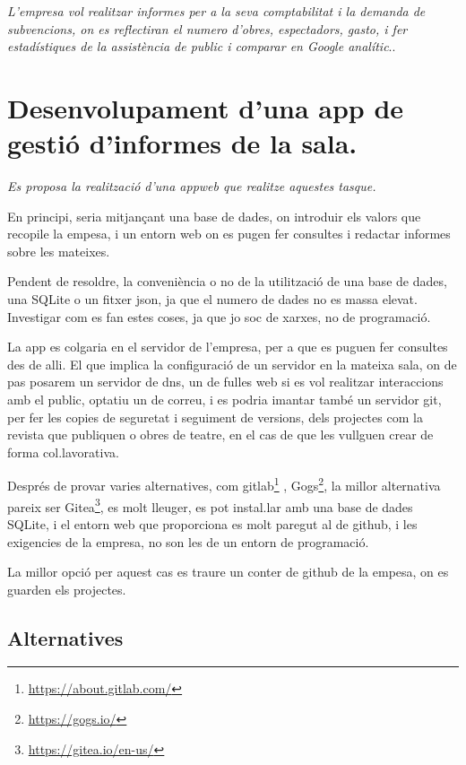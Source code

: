 \documentclass[
  10pt, krantz2,
]{krantz}
\DeclareRobustCommand{\href}[2]{#2\footnote{\url{#1}}}
\renewenvironment{quote}{\begin{VF}}{\end{VF}}
\renewcommand{\href}[2]{#2\footnote{\url{#1}}}
\begin{document}
\emph{L'empresa vol realitzar informes per a la seva comptabilitat i la demanda de subvencions, on es reflectiran el numero d'obres, espectadors, gasto, i fer estadístiques de la assistència de public i comparar en Google analític}..

\hypertarget{desenvolupament-duna-app-de-gestiuxf3-dinformes-de-la-sala.}{%
\section{Desenvolupament d'una app de gestió d'informes de la sala.}\label{desenvolupament-duna-app-de-gestiuxf3-dinformes-de-la-sala.}}

\emph{Es proposa la realització d'una appweb que realitze aquestes tasque.}

En principi, seria mitjançant una base de dades, on introduir els valors que recopile la empesa, i un entorn web on es pugen fer consultes i redactar informes sobre les mateixes.

\begin{quote}
Pendent de resoldre, la conveniència o no de la utilització de una base de dades, una SQLite o un fitxer json, ja que el numero de dades no es massa elevat.\\
Investigar com es fan estes coses, ja que jo soc de xarxes, no de programació.
\end{quote}

La app es colgaria en el servidor de l'empresa, per a que es puguen fer consultes des de alli. El que implica la configuració de un servidor en la mateixa sala, on de pas posarem un servidor de dns, un de fulles web si es vol realitzar interaccions amb el public, optatiu un de correu, i es podria imantar també un servidor git, per fer les copies de seguretat i seguiment de versions, dels projectes com la revista que publiquen o obres de teatre, en el cas de que les vullguen crear de forma col.lavorativa.

Després de provar varies alternatives, com \href{https://about.gitlab.com/}{gitlab} , \href{https://gogs.io/}{Gogs}, la millor alternativa pareix ser \href{https://gitea.io/en-us/}{Gitea}, es molt lleuger, es pot instal.lar amb una base de dades SQLite, i el entorn web que proporciona es molt paregut al de github, i les exigencies de la empresa, no son les de un entorn de programació.

La millor opció per aquest cas es traure un conter de github de la empesa, on es guarden els projectes.

\hypertarget{alternatives}{%
\subsection{Alternatives}\label{alternatives}}
\end{document}
